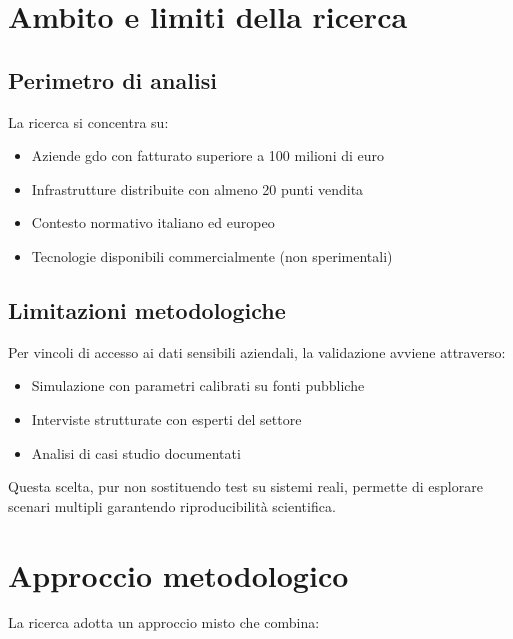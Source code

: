 \section{\texorpdfstring{Ambito e limiti della ricerca}{1.4 - Ambito e limiti della ricerca}}
\label{sec:ambito_limiti}

\subsection{\texorpdfstring{Perimetro di analisi}{1.4.1 - Perimetro di analisi}}
\label{subsec:perimetro}

La ricerca si concentra su:
\begin{itemize}
\item Aziende \gls{gdo} con fatturato superiore a 100 milioni di euro
\item Infrastrutture distribuite con almeno 20 punti vendita
\item Contesto normativo italiano ed europeo
\item Tecnologie disponibili commercialmente (non sperimentali)
\end{itemize}

\subsection{\texorpdfstring{Limitazioni metodologiche}{1.4.2 - Limitazioni metodologiche}}
\label{subsec:limitazioni}

Per vincoli di accesso ai dati sensibili aziendali, la validazione avviene attraverso:
\begin{itemize}
\item Simulazione con parametri calibrati su fonti pubbliche
\item Interviste strutturate con esperti del settore
\item Analisi di casi studio documentati
\end{itemize}

Questa scelta, pur non sostituendo test su sistemi reali, permette di esplorare scenari multipli garantendo riproducibilità scientifica.

\section{\texorpdfstring{Approccio metodologico}{1.5 - Approccio metodologico}}
\label{sec:approccio_metodologico}

La ricerca adotta un approccio misto che combina:

